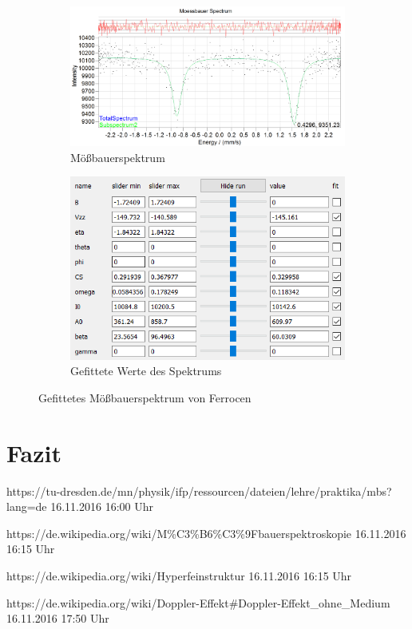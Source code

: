 \documentclass[german, %
parskip=full, %
bibliography=totoc, %
]{scrartcl}
\begin{document}
\begin{figure}[ht]
	\centering
	\begin{subfigure}[b]{0.5\textwidth}
		\includegraphics[width=\textwidth]{MoessbauerFerrocen}
	  \caption{Mößbauerspektrum}
	  \label{fig:moessferrocen}
  \end{subfigure}
  \begin{subfigure}[b]{0.4\textwidth}
	  \includegraphics[width=\textwidth]{WerteFerrocen}
	  \caption{Gefittete Werte des Spektrums}
	  \label{fig:werteferrocen}
  \end{subfigure}
	\caption{Gefittetes Mößbauerspektrum von Ferrocen}
\end{figure}

\section{Fazit}




\begin{thebibliography}{9}

  https://tu-dresden.de/mn/physik/ifp/ressourcen/dateien/lehre/praktika/mbs?lang=de
	16.11.2016
	16:00 Uhr
	
  https://de.wikipedia.org/wiki/M\%C3\%B6\%C3\%9Fbauerspektroskopie
	16.11.2016
	16:15 Uhr
	
  https://de.wikipedia.org/wiki/Hyperfeinstruktur
	16.11.2016
	16:15 Uhr
	
  https://de.wikipedia.org/wiki/Doppler-Effekt\#Doppler-Effekt\_ohne\_Medium
	16.11.2016
	17:50 Uhr

\end{thebibliography}
\end{document}
